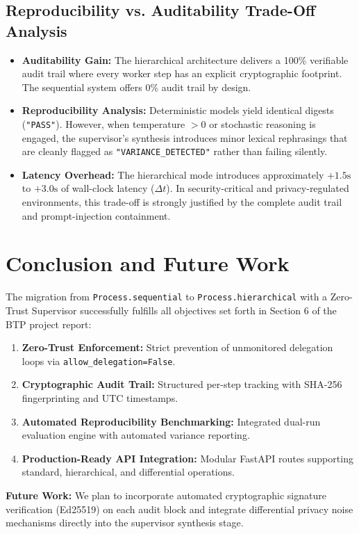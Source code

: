 \documentclass[10pt,a4paper]{article}
\begin{document}
\subsection{Reproducibility vs. Auditability Trade-Off Analysis}
\begin{itemize}
    \item \textbf{Auditability Gain:} The hierarchical architecture delivers a 100\% verifiable audit trail where every worker step has an explicit cryptographic footprint. The sequential system offers 0\% audit trail by design.
    \item \textbf{Reproducibility Analysis:} Deterministic models yield identical digests (\texttt{"PASS"}). However, when temperature $> 0$ or stochastic reasoning is engaged, the supervisor's synthesis introduces minor lexical rephrasings that are cleanly flagged as \texttt{"VARIANCE\_DETECTED"} rather than failing silently.
    \item \textbf{Latency Overhead:} The hierarchical mode introduces approximately $+1.5\text{s}$ to $+3.0\text{s}$ of wall-clock latency ($\Delta t$). In security-critical and privacy-regulated environments, this trade-off is strongly justified by the complete audit trail and prompt-injection containment.
\end{itemize}

\section{Conclusion and Future Work}
The migration from \texttt{Process.sequential} to \texttt{Process.hierarchical} with a Zero-Trust Supervisor successfully fulfills all objectives set forth in Section 6 of the BTP project report:
\begin{enumerate}
    \item \textbf{Zero-Trust Enforcement:} Strict prevention of unmonitored delegation loops via \texttt{allow\_delegation=False}.
    \item \textbf{Cryptographic Audit Trail:} Structured per-step tracking with SHA-256 fingerprinting and UTC timestamps.
    \item \textbf{Automated Reproducibility Benchmarking:} Integrated dual-run evaluation engine with automated variance reporting.
    \item \textbf{Production-Ready API Integration:} Modular FastAPI routes supporting standard, hierarchical, and differential operations.
\end{enumerate}

\noindent
\textbf{Future Work:} We plan to incorporate automated cryptographic signature verification (Ed25519) on each audit block and integrate differential privacy noise mechanisms directly into the supervisor synthesis stage.
\end{document}
